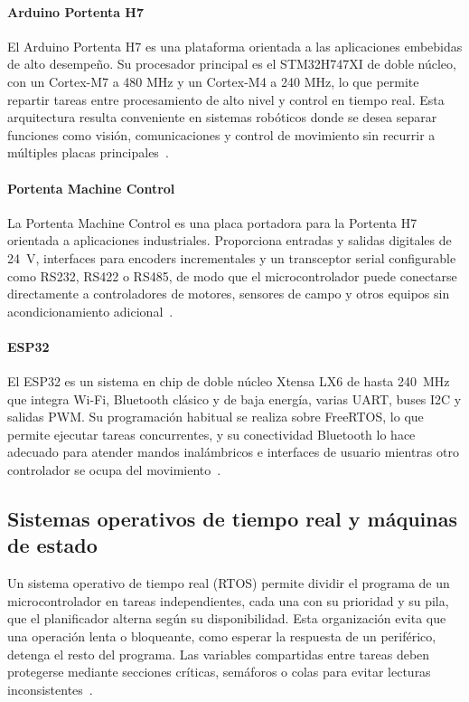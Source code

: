 \paragraph{Arduino Portenta H7} El Arduino Portenta H7 es una plataforma orientada a las aplicaciones embebidas de alto desempeño. Su procesador principal es el STM32H747XI de doble núcleo, con un Cortex-M7 a 480 MHz y un Cortex-M4 a 240 MHz, lo que permite repartir tareas entre procesamiento de alto nivel y control en tiempo real. Esta arquitectura resulta conveniente en sistemas robóticos donde se desea separar funciones como visión, comunicaciones y control de movimiento sin recurrir a múltiples placas principales~\cite{arduino2024portenta}.

\paragraph{Portenta Machine Control} La Portenta Machine Control es una placa portadora para la Portenta H7 orientada a aplicaciones industriales. Proporciona entradas y salidas digitales de 24~V, interfaces para encoders incrementales y un transceptor serial configurable como RS232, RS422 o RS485, de modo que el microcontrolador puede conectarse directamente a controladores de motores, sensores de campo y otros equipos sin acondicionamiento adicional~\cite{arduinoMachineControl}.

\paragraph{ESP32} El ESP32 es un sistema en chip de doble núcleo Xtensa LX6 de hasta 240~MHz que integra Wi-Fi, Bluetooth clásico y de baja energía, varias UART, buses I2C y salidas PWM. Su programación habitual se realiza sobre FreeRTOS, lo que permite ejecutar tareas concurrentes, y su conectividad Bluetooth lo hace adecuado para atender mandos inalámbricos e interfaces de usuario mientras otro controlador se ocupa del movimiento~\cite{espressifEsp32}.

\subsection{Sistemas operativos de tiempo real y máquinas de estado}
Un sistema operativo de tiempo real (RTOS) permite dividir el programa de un microcontrolador en tareas independientes, cada una con su prioridad y su pila, que el planificador alterna según su disponibilidad. Esta organización evita que una operación lenta o bloqueante, como esperar la respuesta de un periférico, detenga el resto del programa. Las variables compartidas entre tareas deben protegerse mediante secciones críticas, semáforos o colas para evitar lecturas inconsistentes~\cite{barry2016freertos}.

